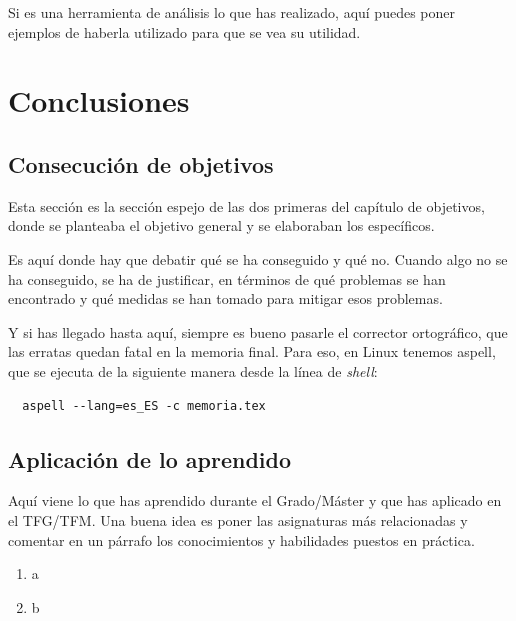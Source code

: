 \documentclass[a4paper, 12pt]{book}
\begin{document}
Si es una herramienta de análisis lo que has realizado, aquí puedes poner ejemplos de haberla utilizado para que se vea su utilidad.



\cleardoublepage
\chapter{Conclusiones}
\label{chap:conclusiones}


\section{Consecución de objetivos}
\label{sec:consecucion-objetivos}

Esta sección es la sección espejo de las dos primeras del capítulo de objetivos, donde se planteaba el objetivo general y se elaboraban los específicos.

Es aquí donde hay que debatir qué se ha conseguido y qué no. 
Cuando algo no se ha conseguido, se ha de justificar, en términos de qué problemas se han encontrado y qué medidas se han tomado para mitigar esos problemas.

Y si has llegado hasta aquí, siempre es bueno pasarle el corrector ortográfico, que las erratas quedan fatal en la memoria final.
Para eso, en Linux tenemos aspell, que se ejecuta de la siguiente manera desde la línea de \emph{shell}:

\begin{verbatim}
  aspell --lang=es_ES -c memoria.tex
\end{verbatim}

\section{Aplicación de lo aprendido}
\label{sec:aplicacion}

Aquí viene lo que has aprendido durante el Grado/Máster y que has aplicado en el TFG/TFM. Una buena idea es poner las asignaturas más relacionadas y comentar en un párrafo los conocimientos y habilidades puestos en práctica.

\begin{enumerate}
  \item a
  \item b
\end{enumerate}
\end{document}
